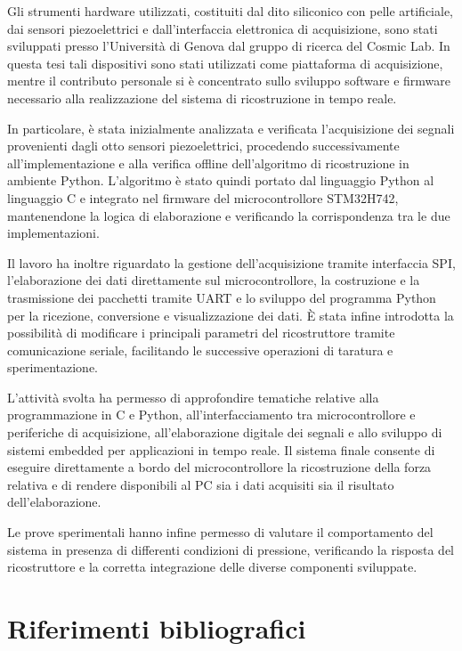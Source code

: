 \documentclass[10pt, a4paper]{article}
\begin{document}
            Gli strumenti hardware utilizzati, costituiti dal dito siliconico con pelle artificiale, dai sensori piezoelettrici e dall'interfaccia elettronica di 
            acquisizione, sono stati sviluppati presso l'Università di Genova dal gruppo di ricerca del Cosmic Lab. In questa tesi tali dispositivi sono stati 
            utilizzati come piattaforma di acquisizione, mentre il contributo personale si è concentrato sullo sviluppo software e firmware necessario alla 
            realizzazione del sistema di ricostruzione in tempo reale.

            In particolare, è stata inizialmente analizzata e verificata l'acquisizione dei segnali provenienti dagli otto sensori piezoelettrici, procedendo 
            successivamente all'implementazione e alla verifica offline dell'algoritmo di ricostruzione in ambiente Python. L'algoritmo è stato quindi portato 
            dal linguaggio Python al linguaggio C e integrato nel firmware del microcontrollore STM32H742, mantenendone la logica di elaborazione e verificando 
            la corrispondenza tra le due implementazioni.

            Il lavoro ha inoltre riguardato la gestione dell'acquisizione tramite interfaccia SPI, l'elaborazione dei dati direttamente sul microcontrollore, 
            la costruzione e la trasmissione dei pacchetti tramite UART e lo sviluppo del programma Python per la ricezione, conversione e visualizzazione dei 
            dati. È stata infine introdotta la possibilità di modificare i principali parametri del ricostruttore tramite comunicazione seriale, facilitando 
            le successive operazioni di taratura e sperimentazione.

            L'attività svolta ha permesso di approfondire tematiche relative alla programmazione in C e Python, all'interfacciamento tra microcontrollore e 
            periferiche di acquisizione, all'elaborazione digitale dei segnali e allo sviluppo di sistemi embedded per applicazioni in tempo reale. Il sistema 
            finale consente di eseguire direttamente a bordo del microcontrollore la ricostruzione della forza relativa e di rendere disponibili al PC sia i 
            dati acquisiti sia il risultato dell'elaborazione.

            Le prove sperimentali hanno infine permesso di valutare il comportamento del sistema in presenza di differenti condizioni di pressione, verificando 
            la risposta del ricostruttore e la corretta integrazione delle diverse componenti sviluppate.
    \newpage            
    \section{Riferimenti bibliografici}
\end{document}

